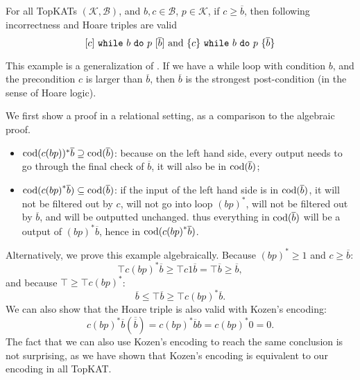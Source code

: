 \begin{example}
    For all TopKATs \((\mathcal{K}, \mathcal{B})\), and \(b, c \in \mathcal{B}\), \(p \in \mathcal{K}\),
    if \(c \geq \overline{b}\), then following incorrectness and Hoare triples are valid
    \[[c]~\mathtt{while}~b~\mathtt{do}~p~[\overline{b}] 
    \text{ and }
    \{c\}~\mathtt{while}~b~\mathtt{do}~p~\{\overline{b}\}\]

  This example is a generalization of .
If we have a while loop with condition \(b\),
and the precondition \(c\) is larger than \(\overline{b}\),
then \(\overline{b}\) is the strongest post-condition (in the sense of Hoare logic).

We first show a proof in a relational setting, as a comparison to the algebraic proof.
\begin{itemize}
    \item \(\operatorname{\mathrm{cod}}(c {(b p))^* \overline{b}} \supseteq \operatorname{\mathrm{cod}}(\overline{b})\):
        because on the left hand side, every output needs to go through the final check 
        of \(\overline{b}\), it will also be in \(\operatorname{\mathrm{cod}}(\overline{b})\);
    \item \(\operatorname{\mathrm{cod}}(c {(b p)}^* \overline{b}) \subseteq \operatorname{\mathrm{cod}}(\overline{b})\):
        if the input of the left hand side is in \(\operatorname{\mathrm{cod}}(\overline{b})\), 
        it will not be filtered out by \(c\), will not go into loop \({(b p)}^*\),
        will not be filtered out by \(\overline{b}\), and will be outputted unchanged. 
        thus everything in \(\operatorname{\mathrm{cod}}(\overline{b})\) will 
        be a output of \( {(b p)}^* \overline{b}\),
        hence in \(\operatorname{\mathrm{cod}}(c {(b p)}^* \overline{b})\).
\end{itemize}

Alternatively, we prove this example algebraically.
Because \({(bp)}^* \geq 1\) and \(c \geq \overline{b}\): 
\[\top c {(b p)}^* \overline{b} \geq \top c 1 \overline{b} = \top \overline{b} \geq \overline{b},\]
and because \(\top \geq \top c {(b p)}^*\):
\[\overline{b} \leq \top \overline{b} \geq \top c {(b p)}^* \overline{b}.\]
We can also show that the Hoare triple is also valid with Kozen's encoding:
\[c {(bp)}^* \overline{b} (\overline{\overline{b}}) = c {(bp)}^* \overline{b} b = c {(bp)}^* 0 = 0.\]
The fact that we can also use Kozen's encoding to reach the same conclusion is not surprising,
as we have shown that Kozen's encoding is equivalent to our encoding in all TopKAT.
 \end{example}

